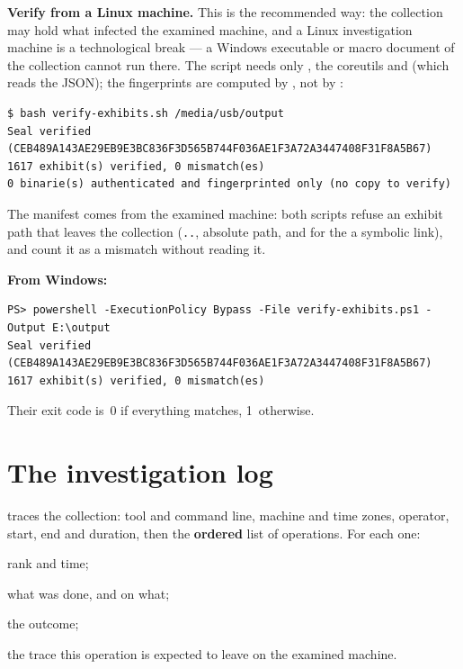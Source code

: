 \documentclass[11pt,a4paper,oneside]{report}
\begin{document}
\textbf{Verify from a Linux machine.} This is the recommended way: the
collection may hold what infected the examined machine, and a Linux
investigation machine is a technological break — a Windows executable or macro
document of the collection cannot run there. The script needs only
, the coreutils and  (which reads the JSON);
the fingerprints are computed by , not by \wac{}:

\begin{lstlisting}
$ bash verify-exhibits.sh /media/usb/output
Seal verified (CEB489A143AE29EB9E3BC836F3D565B744F036AE1F3A72A3447408F31F8A5B67)
1617 exhibit(s) verified, 0 mismatch(es)
0 binarie(s) authenticated and fingerprinted only (no copy to verify)
\end{lstlisting}

The manifest comes from the examined machine: both scripts refuse an exhibit
path that leaves the collection (\texttt{..}, absolute path, and for the
 a symbolic link), and count it as a mismatch without reading it.

\textbf{From Windows:}

\begin{lstlisting}
PS> powershell -ExecutionPolicy Bypass -File verify-exhibits.ps1 -Output E:\output
Seal verified (CEB489A143AE29EB9E3BC836F3D565B744F036AE1F3A72A3447408F31F8A5B67)
1617 exhibit(s) verified, 0 mismatch(es)
\end{lstlisting}

Their exit code is~0 if everything matches, 1~otherwise.





\section{The investigation log}

 traces the collection: tool and command line,
machine and time zones, operator, start, end and duration, then the
\textbf{ordered} list of operations. For each one:

\begin{description}[style=nextline,leftmargin=1.2em]
  \item[\champ{Seq}, \champ{TimestampUtc}, \champ{TimestampLocal}] rank and time;
  \item[\champ{Operation}, \champ{Target}] what was done, and on what;
  \item[\champ{Result}] the outcome;
  \item[\champ{Footprint}] the trace this operation is expected to leave on the
        examined machine.
\end{description}
\end{document}
